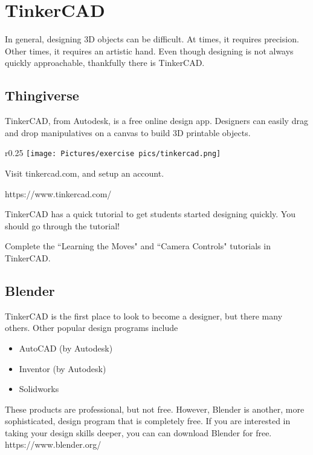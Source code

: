 
\section{TinkerCAD}\label{tinkercad}

In general, designing 3D objects can be difficult. At times, it requires precision. Other times, it requires an artistic hand. Even though designing is not always quickly approachable, thankfully there is TinkerCAD.

\subsection{Thingiverse}

TinkerCAD, from Autodesk, is a free online design app. Designers can easily drag and drop manipulatives on a canvas to build 3D printable objects.

\begin{wrapfigure}{r}{0.25\textwidth} %
    \centering
    \texttt{[image: Pictures/exercise pics/tinkercad.png]}
    \label{fig:tinkercad}
\end{wrapfigure}

\begin{exercise}
Visit tinkercad.com, and setup an account.
\end{exercise}
{\footnotesize https://www.tinkercad.com/}

\noindent TinkerCAD has a quick tutorial to get students started designing quickly. You should go through the tutorial!

\begin{exercise}
Complete the ``Learning the Moves" and ``Camera Controls" tutorials in TinkerCAD.
\end{exercise}

\subsection{Blender}

TinkerCAD is the first place to look to become a designer, but there many others. Other popular design programs include

\begin{itemize}
    \item AutoCAD (by Autodesk)
    \item Inventor (by Autodesk)
    \item Solidworks
\end{itemize}

\noindent These products are professional, but not free. However, Blender is another, more sophisticated, design program that is completely free. If you are interested in taking your design skills deeper, you can can download Blender for free.
{\footnotesize https://www.blender.org/}



